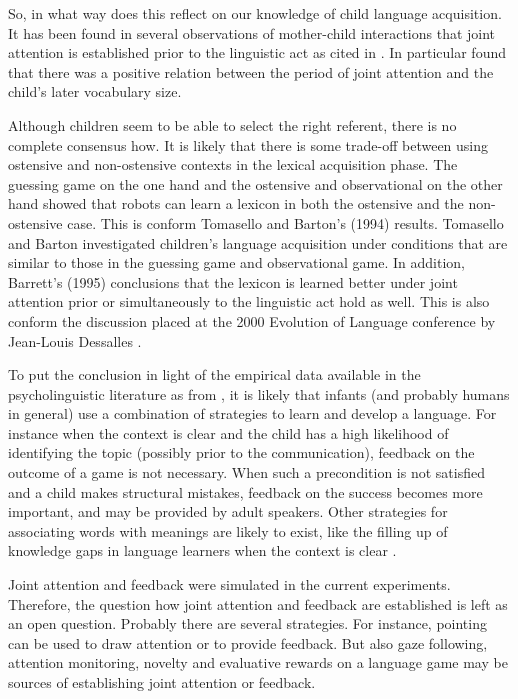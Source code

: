 So, in what way does this reflect on our knowledge of child language acquisition. It has been found in several observations of mother-child interactions that joint attention is established prior to the linguistic act \citep{schafferetal:1983,harrisetal:1983,harrisetal:1984,tomasellotodd:1983,tomaselloetal:1986} as cited in \citep{barrett:1995}. In particular \citep{tomasellotodd:1983,tomaselloetal:1986} found that there was a positive relation between the period of joint attention and the child's later vocabulary size.  

Although children seem to be able to select the right referent, there is no complete consensus how. It is likely that there is some trade-off between using ostensive and non-ostensive contexts in the lexical acquisition phase. The guessing game on the one hand and the ostensive and observational on the other hand showed that robots can learn a lexicon in both the ostensive and the non-ostensive case. This is conform Tomasello and Barton's (1994) results. Tomasello and Barton investigated children's language acquisition under conditions that are similar to those in the guessing game and observational game. In addition, Barrett's (1995) conclusions that the lexicon is learned better under joint attention prior or simultaneously to the linguistic act hold as well. This is also conform the discussion placed at the 2000 Evolution of Language conference by Jean-Louis Dessalles \citep{dessalles:2000}.


To put the conclusion in light of the empirical data available in the psycholinguistic literature as from \citep{braine:1971,demetrasetal:1986,tomasellobarton:1994}, it is likely that infants (and probably humans in general) use a combination of strategies to learn and develop a language. For instance when the context is clear and the child has a high likelihood of identifying the topic (possibly prior to the communication), feedback on the outcome of a game is not necessary. When such a precondition is not satisfied and a child makes structural mistakes, feedback on the success becomes more important, and may be provided by adult speakers. Other strategies for associating words with meanings are likely to exist, like the filling up of knowledge gaps in language learners when the context is clear \citep{clark:1993}.
 

Joint attention and feedback were simulated in the current experiments. Therefore, the question how joint attention and feedback are established is left as an open question. Probably there are several strategies. For instance, pointing can be used to draw attention or to provide feedback. But also gaze following, attention monitoring, novelty and evaluative rewards on a language game may be sources of establishing joint attention or feedback. 

